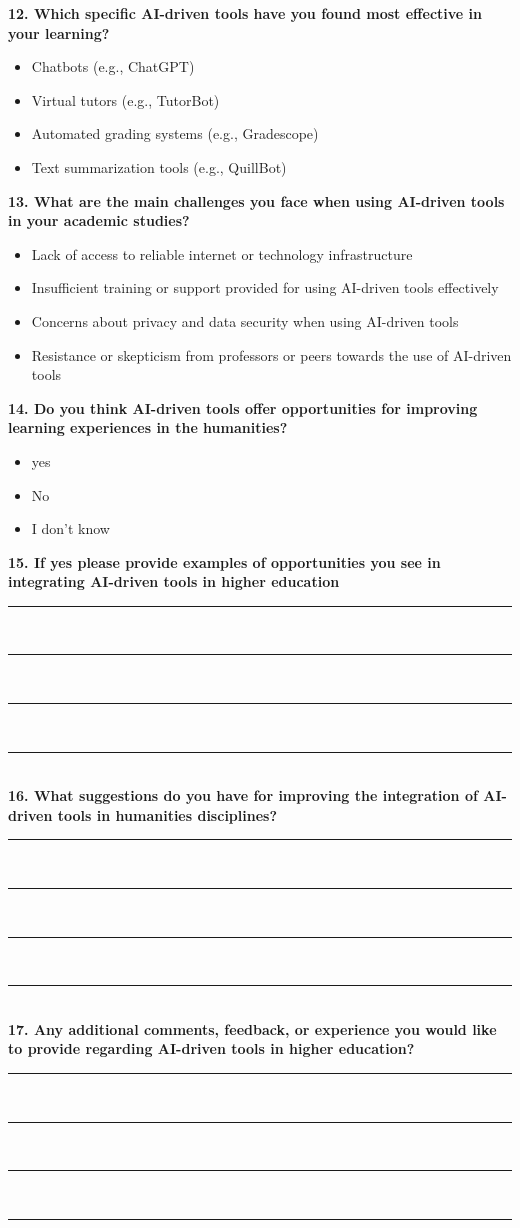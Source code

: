 \noindent\textbf{12. Which specific AI-driven tools have you found most effective in your learning?}
\begin{itemize}
	\item[\checkbox] Chatbots (e.g., ChatGPT)
	\item[\checkbox] Virtual tutors (e.g., TutorBot)
	\item[\checkbox] Automated grading systems (e.g., Gradescope)
	\item[\checkbox] Text summarization tools (e.g., QuillBot)
\end{itemize}

\noindent\textbf{13. What are the main challenges you face when using AI-driven tools in your academic studies?}
\begin{itemize}
	\item [\checkbox] Lack of access to reliable internet or technology infrastructure
	\item [\checkbox] Insufficient training or support provided for using AI-driven tools effectively
	\item [\checkbox] Concerns about privacy and data security when using AI-driven tools
	\item [\checkbox] Resistance or skepticism from professors or peers towards the use of AI-driven tools
\end{itemize}


\noindent\textbf{14. Do you think AI-driven tools offer opportunities for improving learning experiences in the humanities?}
\begin{itemize}
	\item [\checkbox] yes
	\item [\checkbox] No
	\item [\checkbox] I don't know
\end{itemize}


\noindent\textbf{15. If yes please provide examples of opportunities you see in integrating AI-driven tools in higher education}

\noindent\rule{15cm}{0.4pt} \\
\noindent\rule{15cm}{0.4pt} \\
\noindent\rule{15cm}{0.4pt} \\
\noindent\rule{15cm}{0.4pt} \\


\noindent\textbf{16. What suggestions do you have for improving the integration of AI-driven tools in humanities disciplines?}

\noindent\rule{15cm}{0.4pt} \\
\noindent\rule{15cm}{0.4pt} \\
\noindent\rule{15cm}{0.4pt} \\
\noindent\rule{15cm}{0.4pt} \\
\noindent\textbf{17. Any additional comments, feedback, or experience you would like to provide regarding AI-driven tools in higher education?}

\noindent\rule{15cm}{0.4pt} \\
\noindent\rule{15cm}{0.4pt} \\
\noindent\rule{15cm}{0.4pt} \\
\noindent\rule{15cm}{0.4pt} \\
